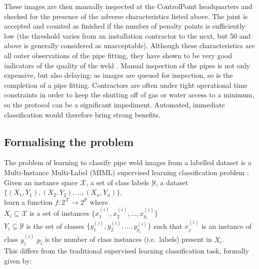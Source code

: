 \documentclass[a4paper,11pt]{article}
\begin{document}
These images are then manually inspected at the ControlPoint headquarters and checked for the presence of the adverse characteristics listed above. The joint is accepted and counted as finished if the number of penalty points is sufficiently low (the threshold varies from an installation contractor to the next, but 50 and above is generally considered as unacceptable). Although these characteristics are all outer observations of the pipe fitting, they have shown to be very good indicators of the quality of the weld \cite{control-point}. Manual inspection of the pipes is not only expensive, but also delaying: as images are queued for inspection, so is the completion of a pipe fitting. Contractors are often under tight operational time constraints in order to keep the shutting off of gas or water access to a minimum, so the protocol can be a significant impediment. Automated, immediate classification would therefore bring strong benefits.

\subsection{Formalising the problem}

The problem of learning to classify pipe weld images from a labelled dataset is a Multi-Instance Multi-Label (MIML) supervised learning classification problem \cite{MIML}: \\

\indent Given an instance space $\mathcal{X}$, a set of class labels $\mathcal{Y}$, a dataset $\{(X_{1},Y_{1}),(X_{2},Y_{2}), ..., (X_{n},Y_{n})\}$,\\ 
\indent learn a function $f : 2^{\mathcal{X}} \rightarrow 2^{\mathcal{Y}}$ where\\  
\indent \indent $X_{i} \subseteq \mathcal{X}$ is a set of instances $\{x_{1}^{(i)}, x_{2}^{(i)}, ..., x_{p_{i}}^{(i)}\}$\\   
\indent \indent $Y_{	i} \subseteq \mathcal{Y}$ is the set of classes $\{y_{1}^{(i)}, y_{2}^{(i)}, ..., y_{p_{i}}^{(i)}\}$ such that $x_{j}^{(i)}$ is an instance of class $y_{j}^{(i)}$ 
\indent \indent $p_{i}$ is the number of class instances (i.e.\ labels) present in $X_{i}$.\\

This differs from the traditional supervised learning classification task, formally given by: \\ 
\end{document}
